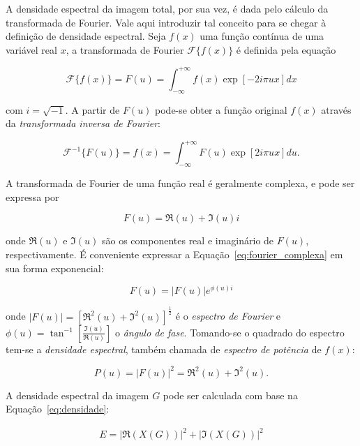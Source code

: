 A densidade espectral da imagem total, por sua vez, é dada pelo
cálculo da transformada de Fourier. Vale aqui introduzir tal conceito
para se chegar à definição de densidade espectral. Seja $f(x)$ uma
função contínua de uma variável real $x$, a transformada de Fourier
$\mathcal{F}\{f(x)\}$ é definida pela equação

\begin{equation}
  \mathcal{F}\{f(x)\} = F(u) = \int_{-\infty}^{+\infty} f(x) \exp[-2i\pi u x] dx
\end{equation}

\noindent com $i = \sqrt{-1}$. A partir de $F(u)$ pode-se obter a função
original $f(x)$ através da \emph{transformada inversa de Fourier}:

\begin{equation}
  \mathcal{F}^{-1}\{F(u)\} = f(x) = \int_{-\infty}^{+\infty} F(u) \exp[2i\pi u x] du.
\end{equation}

A transformada de Fourier de uma função real é geralmente complexa, e pode ser
expressa por

\begin{equation}
  F(u) = \Re(u) + \Im(u)i
  \label{eq:fourier_complexa}
\end{equation}

\noindent onde $\Re(u)$ e $\Im(u)$ são os componentes real e imaginário de
$F(u)$, respectivamente. É conveniente expressar a
Equação~\ref{eq:fourier_complexa} em sua forma exponencial:

\begin{equation}
  F(u) = |F(u)|e^{\phi(u)i}
\end{equation}

\noindent onde $|F(u)| = \left[\Re^2(u) + \Im^2(u)\right]^{\frac{1}{2}}$ é o
\emph{espectro de Fourier} e
$\phi(u) = \tan^{-1}\left[\frac{\Im(u)}{\Re(u)}\right]$ o \emph{ângulo de
  fase}. Tomando-se o quadrado do espectro tem-se a \emph{densidade espectral},
também chamada de \emph{espectro de potência} de $f(x)$:

\begin{equation}
  P(u) = |F(u)|^2 = \Re^2(u) + \Im^2(u).
  \label{eq:densidade}
\end{equation}

A densidade espectral da imagem $G$ pode ser calculada com base na Equação~\ref{eq:densidade}:

\begin{eqnarray}
  E = |\Re(X(G))|^2 + |\Im(X(G))|^2
\end{eqnarray}

